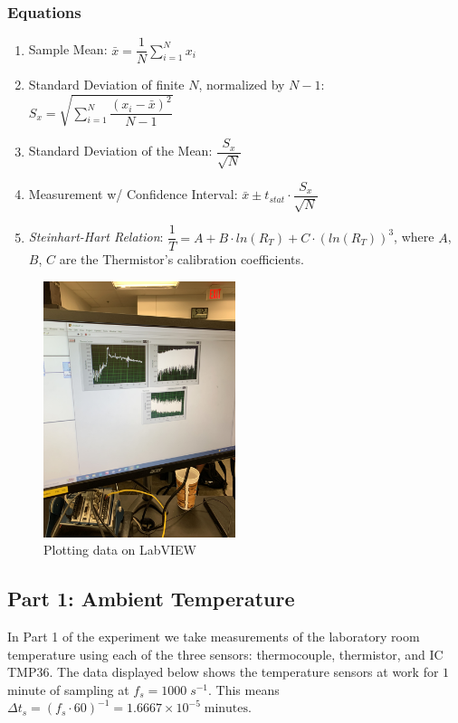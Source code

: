 \documentclass{article}
\begin{document}
\subsubsection*{Equations}
\begin{enumerate}[label = \Roman*.]
    \item Sample Mean: \(\bar{x} = \dfrac{1}{N}\displaystyle\sum_{i=1}^{N} x_{i}\) 
    \item Standard Deviation of finite $N$, normalized by $N-1$: \(S_{x} = \sqrt{\displaystyle\sum_{i=1}^{N} \dfrac{(x_{i} - \bar{x})^{2}}{N-1}}\)
    \item Standard Deviation of the Mean: \(\dfrac{S_{x}}{\sqrt{N}}\)
    \item Measurement w/ Confidence Interval: \(\bar{x} \pm t_{stat}\cdot \dfrac{S_{x}}{\sqrt{N}}\)
    \item \textit{Steinhart-Hart Relation}: \(\dfrac{1}{T} = A + B\cdot ln(R_{T}) + C\cdot (ln(R_{T}))^{3}\), where $A$, $B$, $C$ are the Thermistor's calibration coefficients.
\end{enumerate}
 
\begin{figure}[H]
\centering
\includegraphics[width=0.5\textwidth, angle = -90]{lab2images/labview_plots.jpg}
\caption{Plotting data on LabVIEW}
\end{figure}

\subsection{Part 1: Ambient Temperature}
In Part 1 of the experiment we take measurements of the laboratory room temperature using each of the three sensors: thermocouple, thermistor, and IC TMP36. The data displayed below shows the temperature sensors at work for $1$ minute of sampling at $f_{s} = 1000\; s^{-1}$. This means $\Delta t_{s} = (f_{s}\cdot 60)^{-1} = 1.6667\times10^{-5}\; \text{minutes}$.
\end{document}
